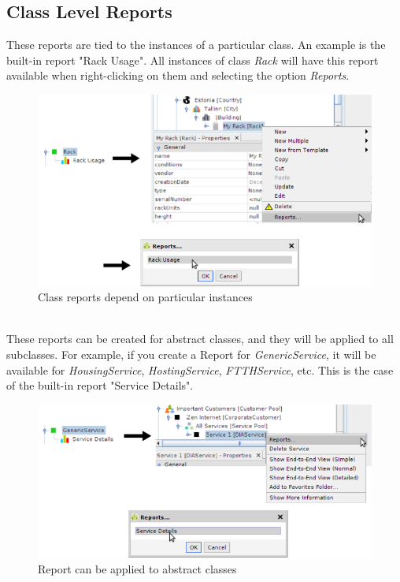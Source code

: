 \documentclass[a4paper]{article}
\begin{document}
		\subsection{Class Level Reports}
			 These reports are tied to the instances of a particular class. An example is the built-in report "Rack Usage". All instances of class \textit{Rack} will have this report available when right-clicking on them and selecting the option \textit{Reports}.
			\begin{figure}[h!]
				\centering
				\includegraphics[scale=0.5]{img/reports_rack_report.png}
				\caption{Class reports depend on particular instances}
				\label{fig:reports_rack_report}
			\end{figure}\\
			These reports can be created for abstract classes, and they will be applied to all subclasses. For example, if you create a Report for \textit{GenericService}, it will be available for \textit{HousingService}, \textit{HostingService}, \textit{FTTHService}, etc. This is the case of the built-in report "Service Details".\\
			\newpage
			\begin{figure}[h!]
				\centering
				\includegraphics[scale=0.6]{img/reports_abstract_class_report.png}
				\caption{Report can be applied to abstract classes}
				\label{fig:reports_abstract_class_report}
			\end{figure}
\end{document}
